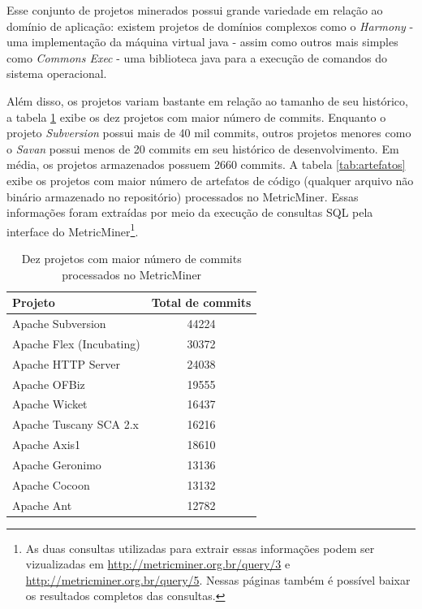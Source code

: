 \documentclass[a4paper, 12pt, twoside]{book}
\begin{document}
        Esse conjunto de projetos minerados possui grande variedade em relação ao domínio de aplicação: existem projetos de domínios complexos como o \textit{Harmony} - uma implementação da máquina virtual java - assim como outros mais simples como \textit{Commons Exec} - uma biblioteca java para a execução de comandos do sistema operacional. 

        Além disso, os projetos variam bastante em relação ao tamanho de seu histórico, a tabela \ref{tab:commits} exibe os dez projetos com maior número de commits. Enquanto o projeto \textit{Subversion} possui mais de 40 mil commits, outros projetos menores como o \textit{Savan} possui menos de 20 commits em seu histórico de desenvolvimento. Em média, os projetos armazenados possuem 2660 commits. A tabela \ref{tab:artefatos} exibe os projetos com maior número de artefatos de código (qualquer arquivo não binário armazenado no repositório) processados no MetricMiner. Essas informações foram extraídas por meio da execução de consultas SQL pela interface do MetricMiner\footnote{As duas consultas utilizadas para extrair essas informações podem ser vizualizadas em \url{http://metricminer.org.br/query/3} e \url{http://metricminer.org.br/query/5}. Nessas páginas também é possível baixar os resultados completos das consultas.}.

        \begin{table}\begin{center}
        \begin{tabular}{| p{6cm} | c |}
            \hline                        
            \textbf{Projeto} & \textbf{Total de commits} \\
            \hline                        
            Apache Subversion & 44224 \\
            \hline
            Apache Flex (Incubating) & 30372 \\
            \hline
            Apache HTTP Server & 24038 \\
            \hline
            Apache OFBiz & 19555 \\
            \hline
            Apache Wicket & 16437 \\
            \hline
            Apache Tuscany SCA 2.x & 16216 \\
            \hline
            Apache Axis1 & 18610 \\
            \hline
            Apache Geronimo & 13136 \\
            \hline
            Apache Cocoon & 13132 \\
            \hline
            Apache Ant & 12782 \\
            \hline
        \end{tabular}
        \caption{Dez projetos com maior número de commits processados no MetricMiner \label{tab:commits}}
        \end{center}\end{table}
\end{document}
